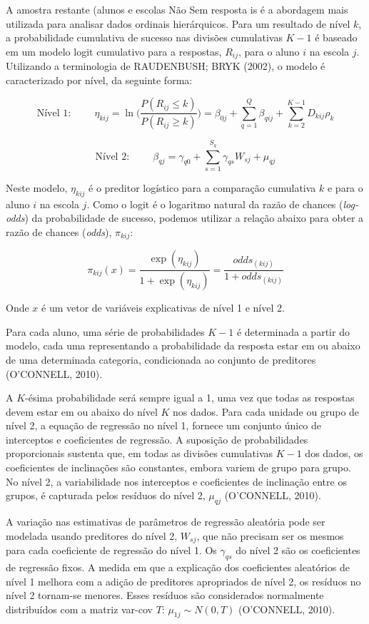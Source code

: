 \documentclass[
]{article}
\begin{document}
A amostra restante (alunos e escolas Não Sem resposta is é a abordagem
mais utilizada para analisar dados ordinais hierárquicos. Para um
resultado de nível \(k\), a probabilidade cumulativa de sucesso nas
divisões cumulativas \(K-1\) é baseado em um modelo logit cumulativo
para a respostas, \(R_{ij}\), para o aluno \(i\) na escola \(j\).
Utilizando a terminologia de RAUDENBUSH; BRYK (2002), o modelo é
caracterizado por nível, da seguinte forma:

\[
\text{Nível 1:}  \hspace{1cm} \eta_{kij} = \ln{\Biggl(\frac{P(R_{ij} \leq k)}{P(R_{ij} \geq k)}\Biggl)} = \beta_{0j} + \sum_{q=1}^{Q} \beta_{qij} + \sum_{k=2}^{K-1} D_{kij}\rho_{k} 
\]

\[
\text{Nível 2:} \hspace{1cm} \beta_{qj} = \gamma_{q0} + \sum_{s=1}^{S_{q}} \gamma_{qs} W_{sj} + \mu_{qj}
\]

Neste modelo, \(\eta_{kij}\) é o preditor logístico para a comparação
cumulativa \(k\) e para o aluno \(i\) na escola \(j\). Como o logit é o
logaritmo natural da razão de chances (\emph{log-odds}) da probabilidade
de sucesso, podemos utilizar a relação abaixo para obter a razão de
chances (\emph{odds}), \(\pi_{kij}\):

\[
 \pi_{kij}(x) = \frac{\exp(\eta_{kij})}{1 + \exp(\eta_{kij})} = \frac{odds_{(kij)}}{1 + odds_{(kij)}}
\]

Onde \(x\) é um vetor de variáveis explicativas de nível 1 e nível 2.

Para cada aluno, uma série de probabilidades \(K-1\) é determinada a
partir do modelo, cada uma representando a probabilidade da resposta
estar em ou abaixo de uma determinada categoria, condicionada ao
conjunto de preditores (O'CONNELL, 2010).

A \(K\)-ésima probabilidade será sempre igual a 1, uma vez que todas as
respostas devem estar em ou abaixo do nível \(K\) nos dados. Para cada
unidade ou grupo de nível 2, a equação de regressão no nível 1, fornece
um conjunto único de interceptos e coeficientes de regressão. A
suposição de probabilidades proporcionais sustenta que, em todas as
divisões cumulativas \(K-1\) dos dados, os coeficientes de inclinações
são constantes, embora variem de grupo para grupo. No nível 2, a
variabilidade nos interceptos e coeficientes de inclinação entre os
grupos, é capturada pelos resíduos do nível 2, \(\mu_{qj}\) (O'CONNELL,
2010).

A variação nas estimativas de parâmetros de regressão aleatória pode ser
modelada usando preditores do nível 2, \(W_{sj}\), que não precisam ser
os mesmos para cada coeficiente de regressão do nível 1. Os
\(\gamma_{qs}\) do nível 2 são os coeficientes de regressão fixos. A
medida em que a explicação dos coeficientes aleatórios de nível 1
melhora com a adição de preditores apropriados de nível 2, os resíduos
no nível 2 tornam-se menores. Esses resíduos são considerados
normalmente distribuídos com a matriz var-cov \(T\):
\(\mu_{1j} \sim N(0, T)\) (O'CONNELL, 2010).
\end{document}
